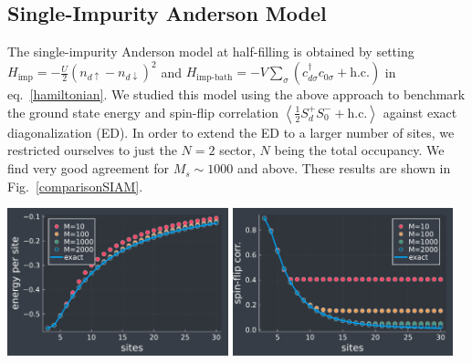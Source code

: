 \documentclass[reprint]{revtex4-2}
\begin{document}
\subsection{Single-Impurity Anderson Model}
The single-impurity Anderson model at half-filling is obtained by setting \(H_\text{imp}=-\frac{U}{2}\left(n_{d \uparrow} - n_{d \downarrow}\right)^2 \) and \(H_\text{imp-bath} = -V\sum_\sigma \left(c^\dagger_{d\sigma}c_{0\sigma} + \text{h.c.}\right)\) in eq.~\ref{hamiltonian}. We studied this model using the above approach to benchmark the ground state energy and spin-flip correlation \(\left<\frac{1}{2}S_d^+ S_0^- + \text{h.c.} \right>\) against exact diagonalization (ED). In order to extend the ED to a larger number of sites, we restricted ourselves to just the \(N=2\) sector, \(N\) being the total occupancy. We find very good agreement for \(M_s \sim 1000\) and above. These results are shown in Fig.~\ref{comparisonSIAM}.
\begin{widetext}
\includegraphics[width=0.48\textwidth]{energy.pdf}
\includegraphics[width=0.48\textwidth]{spinflipcomparison.pdf}
\label{comparisonSIAM}
\end{widetext}
\end{document}
